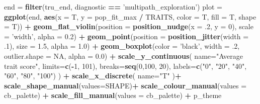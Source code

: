\documentclass[]{book}
\newenvironment{Shaded}{\begin{snugshade}}{\end{snugshade}}
\newcommand{\DataTypeTok}[1]{\textcolor[rgb]{0.13,0.29,0.53}{#1}}
\newcommand{\DecValTok}[1]{\textcolor[rgb]{0.00,0.00,0.81}{#1}}
\newcommand{\FloatTok}[1]{\textcolor[rgb]{0.00,0.00,0.81}{#1}}
\newcommand{\KeywordTok}[1]{\textcolor[rgb]{0.13,0.29,0.53}{\textbf{#1}}}
\newcommand{\NormalTok}[1]{#1}
\newcommand{\OperatorTok}[1]{\textcolor[rgb]{0.81,0.36,0.00}{\textbf{#1}}}
\newcommand{\OtherTok}[1]{\textcolor[rgb]{0.56,0.35,0.01}{#1}}
\newcommand{\StringTok}[1]{\textcolor[rgb]{0.31,0.60,0.02}{#1}}
\begin{document}
\begin{Shaded}
\begin{Highlighting}[]
\NormalTok{end =}\StringTok{ }\KeywordTok{filter}\NormalTok{(tru_end, diagnostic }\OperatorTok{==}\StringTok{ 'multipath_exploration'}\NormalTok{)}
\NormalTok{plot =}\StringTok{ }\KeywordTok{ggplot}\NormalTok{(end, }\KeywordTok{aes}\NormalTok{(}\DataTypeTok{x =}\NormalTok{ T, }\DataTypeTok{y =}\NormalTok{ pop_fit_max }\OperatorTok{/}\StringTok{ }\NormalTok{TRAITS, }\DataTypeTok{color =}\NormalTok{ T, }\DataTypeTok{fill =}\NormalTok{ T, }\DataTypeTok{shape =}\NormalTok{ T)) }\OperatorTok{+}
\StringTok{  }\KeywordTok{geom_flat_violin}\NormalTok{(}\DataTypeTok{position =} \KeywordTok{position_nudge}\NormalTok{(}\DataTypeTok{x =} \FloatTok{.2}\NormalTok{, }\DataTypeTok{y =} \DecValTok{0}\NormalTok{), }\DataTypeTok{scale =} \StringTok{'width'}\NormalTok{, }\DataTypeTok{alpha =} \FloatTok{0.2}\NormalTok{) }\OperatorTok{+}
\StringTok{  }\KeywordTok{geom_point}\NormalTok{(}\DataTypeTok{position =} \KeywordTok{position_jitter}\NormalTok{(}\DataTypeTok{width =} \FloatTok{.1}\NormalTok{), }\DataTypeTok{size =} \FloatTok{1.5}\NormalTok{, }\DataTypeTok{alpha =} \FloatTok{1.0}\NormalTok{) }\OperatorTok{+}
\StringTok{  }\KeywordTok{geom_boxplot}\NormalTok{(}\DataTypeTok{color =} \StringTok{'black'}\NormalTok{, }\DataTypeTok{width =} \FloatTok{.2}\NormalTok{, }\DataTypeTok{outlier.shape =} \OtherTok{NA}\NormalTok{, }\DataTypeTok{alpha =} \FloatTok{0.0}\NormalTok{) }\OperatorTok{+}
\StringTok{  }\KeywordTok{scale_y_continuous}\NormalTok{(}
    \DataTypeTok{name=}\StringTok{"Average trait score"}\NormalTok{,}
    \DataTypeTok{limits=}\KeywordTok{c}\NormalTok{(}\OperatorTok{-}\DecValTok{1}\NormalTok{, }\DecValTok{101}\NormalTok{),}
    \DataTypeTok{breaks=}\KeywordTok{seq}\NormalTok{(}\DecValTok{0}\NormalTok{,}\DecValTok{100}\NormalTok{, }\DecValTok{20}\NormalTok{),}
    \DataTypeTok{labels=}\KeywordTok{c}\NormalTok{(}\StringTok{"0"}\NormalTok{, }\StringTok{"20"}\NormalTok{, }\StringTok{"40"}\NormalTok{, }\StringTok{"60"}\NormalTok{, }\StringTok{"80"}\NormalTok{, }\StringTok{"100"}\NormalTok{)}
\NormalTok{  ) }\OperatorTok{+}
\StringTok{  }\KeywordTok{scale_x_discrete}\NormalTok{(}
    \DataTypeTok{name=}\StringTok{"T"}
\NormalTok{  )}\OperatorTok{+}
\StringTok{  }\KeywordTok{scale_shape_manual}\NormalTok{(}\DataTypeTok{values=}\NormalTok{SHAPE)}\OperatorTok{+}
\StringTok{  }\KeywordTok{scale_colour_manual}\NormalTok{(}\DataTypeTok{values =}\NormalTok{ cb_palette) }\OperatorTok{+}
\StringTok{  }\KeywordTok{scale_fill_manual}\NormalTok{(}\DataTypeTok{values =}\NormalTok{ cb_palette) }\OperatorTok{+}
\StringTok{  }\NormalTok{p_theme}


\end{Highlighting}
\end{Shaded}
\end{document}
